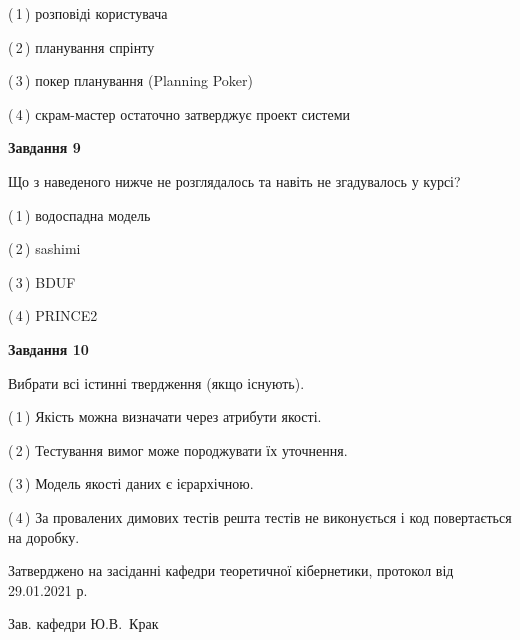 \documentclass[10pt, ukrainian]{article}
\begin{document}
{\begin {large}
(\,1\,) розповіді користувача%



(\,2\,) планування спрінту%



(\,3\,) покер планування (Planning Poker)%



(\,4\,) скрам-мастер остаточно затверджує проект системи%


{\begin {center}\textbf{Завдання 9}\end {center}}\par
Що з наведеного нижче не розглядалось та навіть не згадувалось у курсі?\par
\vspace{2mm}



(\,1\,) водоспадна модель%



(\,2\,) sashimi%



(\,3\,) BDUF%



(\,4\,) PRINCE2%


{\begin {center}\textbf{Завдання 10}\end {center}}\par
Вибрати всі істинні твердження (якщо існують).\par
\vspace{2mm}



(\,1\,) Якість можна визначати через атрибути якості.%



(\,2\,) Тестування вимог може породжувати їх уточнення.%



(\,3\,) Модель якості даних є ієрархічною.%



(\,4\,) За провалених димових тестів решта тестів не виконується і код повертається на доробку.%



\end {large}}
{\vspace{5mm}\smallskip \begin {small} Затверджено на засіданні кафедри теоретичної кібернетики, протокол  від   29.01.2021 р.\par\smallskip\smallskip
{\parbox {6.5 cm}{Зав. кафедри \dotfill Ю.В.~Крак}} \end{small}}
\newpage
\end{document}
